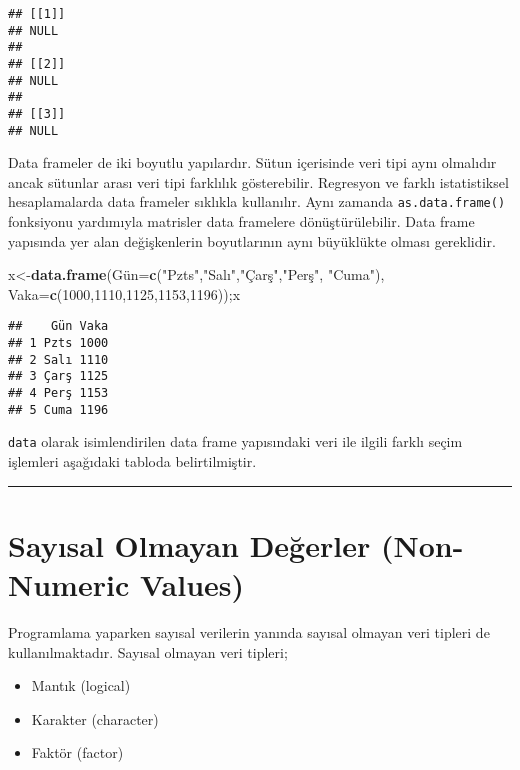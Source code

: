 \documentclass[
]{book}
\newenvironment{Shaded}{\begin{snugshade}}{\end{snugshade}}
\newcommand{\DataTypeTok}[1]{\textcolor[rgb]{0.13,0.29,0.53}{#1}}
\newcommand{\DecValTok}[1]{\textcolor[rgb]{0.00,0.00,0.81}{#1}}
\newcommand{\KeywordTok}[1]{\textcolor[rgb]{0.13,0.29,0.53}{\textbf{#1}}}
\newcommand{\NormalTok}[1]{#1}
\newcommand{\StringTok}[1]{\textcolor[rgb]{0.31,0.60,0.02}{#1}}
\providecommand{\tightlist}{%
  \setlength{\itemsep}{0pt}\setlength{\parskip}{0pt}}
\begin{document}
\begin{verbatim}
## [[1]]
## NULL
##
## [[2]]
## NULL
##
## [[3]]
## NULL
\end{verbatim}

Data frameler de iki boyutlu yapılardır. Sütun içerisinde veri tipi aynı olmalıdır ancak sütunlar arası veri tipi farklılık gösterebilir. Regresyon ve farklı istatistiksel hesaplamalarda data frameler sıklıkla kullanılır. Aynı zamanda \texttt{as.data.frame()} fonksiyonu yardımıyla matrisler data framelere dönüştürülebilir. Data frame yapısında yer alan değişkenlerin boyutlarının aynı büyüklükte olması gereklidir.

\begin{Shaded}
\begin{Highlighting}[]
\NormalTok{x<-}\KeywordTok{data.frame}\NormalTok{(Gün=}\KeywordTok{c}\NormalTok{(}\StringTok{"Pzts"}\NormalTok{,}\StringTok{"Salı"}\NormalTok{,}\StringTok{"Çarş"}\NormalTok{,}\StringTok{"Perş"}\NormalTok{, }\StringTok{"Cuma"}\NormalTok{), }\DataTypeTok{Vaka=}\KeywordTok{c}\NormalTok{(}\DecValTok{1000}\NormalTok{,}\DecValTok{1110}\NormalTok{,}\DecValTok{1125}\NormalTok{,}\DecValTok{1153}\NormalTok{,}\DecValTok{1196}\NormalTok{));x}
\end{Highlighting}
\end{Shaded}

\begin{verbatim}
##    Gün Vaka
## 1 Pzts 1000
## 2 Salı 1110
## 3 Çarş 1125
## 4 Perş 1153
## 5 Cuma 1196
\end{verbatim}

\texttt{data} olarak isimlendirilen data frame yapısındaki veri ile ilgili farklı seçim işlemleri aşağıdaki tabloda belirtilmiştir.

\begin{center}\rule{0.5\linewidth}{0.5pt}\end{center}

\hypertarget{sayux131sal-olmayan-deux11ferler-non-numeric-values}{%
\section{Sayısal Olmayan Değerler (Non-Numeric Values)}\label{sayux131sal-olmayan-deux11ferler-non-numeric-values}}

Programlama yaparken sayısal verilerin yanında sayısal olmayan veri tipleri de kullanılmaktadır. Sayısal olmayan veri tipleri;

\begin{itemize}
\tightlist
\item
  Mantık (logical)
\item
  Karakter (character)
\item
  Faktör (factor)
\end{itemize}
\end{document}
